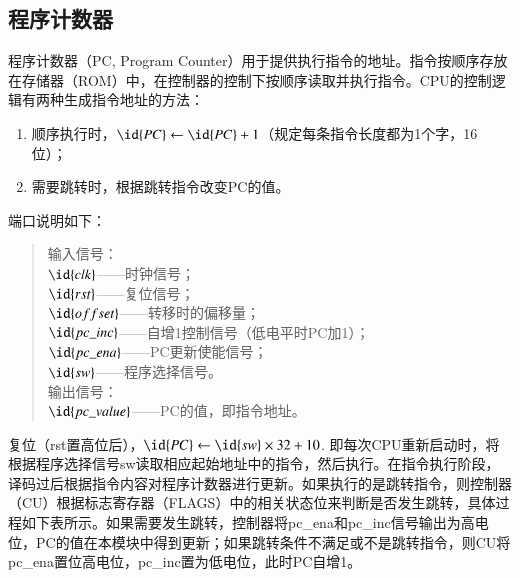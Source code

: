 \documentclass[titlepage, 11pt]{article}
\begin{document}
		\subsection{程序计数器}
		程序计数器（PC, Program Counter）用于提供执行指令的地址。指令按顺序存放在存储器（ROM）中，在控制器的控制下按顺序读取并执行指令。CPU的控制逻辑有两种生成指令地址的方法：
		\begin{enumerate}[(1)]
			\item 顺序执行时，$\id{PC}\gets \id{PC}+1$（规定每条指令长度都为1个字，16位）；
			\item 需要跳转时，根据跳转指令改变PC的值。
		\end{enumerate}
		\par 端口说明如下：
		\begin{quote}
			输入信号：\\
		    $\id{clk}$——时钟信号；\\
		    $\id{rst}$——复位信号；\\
		    $\id{offset}$——转移时的偏移量；\\
		    $\id{pc\_inc}$——自增1控制信号（低电平时PC加1）；\\
		    $\id{pc\_ena}$——PC更新使能信号；\\
		    $\id{sw}$——程序选择信号。\\
		    输出信号：\\
		    $\id{pc\_value}$——PC的值，即指令地址。
		\end{quote}\par 
		复位（rst置高位后），$\id{PC}\gets \id{sw}\times 32+10$. 即每次CPU重新启动时，将根据程序选择信号sw读取相应起始地址中的指令，然后执行。在指令执行阶段，译码过后根据指令内容对程序计数器进行更新。如果执行的是跳转指令，则控制器（CU）根据标志寄存器（FLAGS）中的相关状态位来判断是否发生跳转，具体过程如下表所示。如果需要发生跳转，控制器将pc\_ena和pc\_inc信号输出为高电位，PC的值在本模块中得到更新；如果跳转条件不满足或不是跳转指令，则CU将pc\_ena置位高电位，pc\_inc置为低电位，此时PC自增1。
\end{document}
